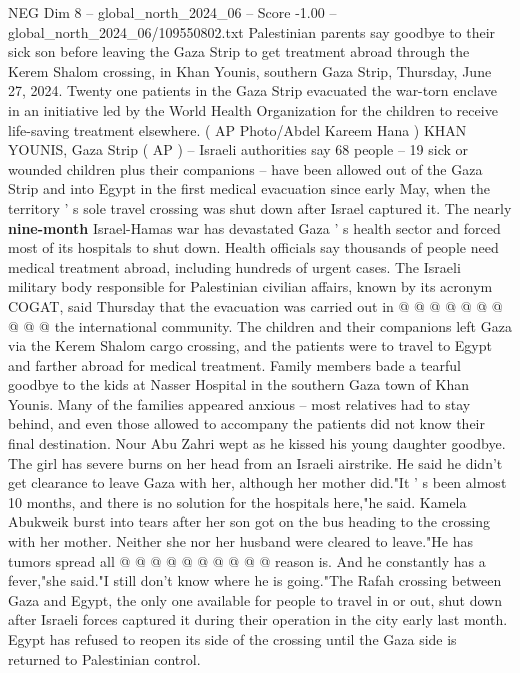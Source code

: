 \begin{textsample}{NEG Dim 8 – global\_north\_2024\_06 – Score -1.00 – global\_north\_2024\_06/109550802.txt}  \label{ex:f8_neg_196}
Palestinian parents say goodbye to their sick son before leaving the Gaza Strip to get treatment abroad through the Kerem Shalom crossing, in Khan Younis, southern Gaza Strip, Thursday, June 27, 2024.
Twenty one patients in the Gaza Strip evacuated the war-torn enclave in an initiative led by the World Health Organization for the children to receive life-saving treatment elsewhere. ( AP Photo/Abdel Kareem Hana ) KHAN YOUNIS, Gaza Strip ( AP ) -- Israeli authorities say 68 people -- 19 sick or wounded children plus their companions -- have been allowed out of the Gaza Strip and into Egypt in the first medical evacuation since early May, when the territory ' s sole travel crossing was shut down after Israel captured it.
The nearly \textbf{nine-month} Israel-Hamas war has devastated Gaza ' s health sector and forced most of its hospitals to shut down.
Health officials say thousands of people need medical treatment abroad, including hundreds of urgent cases.
The Israeli military body responsible for Palestinian civilian affairs, known by its acronym COGAT, said Thursday that the evacuation was carried out in @ @ @ @ @ @ @ @ @ @ the international community.
The children and their companions left Gaza via the Kerem Shalom cargo crossing, and the patients were to travel to Egypt and farther abroad for medical treatment.
Family members bade a tearful goodbye to the kids at Nasser Hospital in the southern Gaza town of Khan Younis.
Many of the families appeared anxious -- most relatives had to stay behind, and even those allowed to accompany the patients did not know their final destination.
Nour Abu Zahri wept as he kissed his young daughter goodbye.
The girl has severe burns on her head from an Israeli airstrike.
He said he didn't get clearance to leave Gaza with her, although her mother did."It ' s been almost 10 months, and there is no solution for the hospitals here,"he said.
Kamela Abukweik burst into tears after her son got on the bus heading to the crossing with her mother.
Neither she nor her husband were cleared to leave."He has tumors spread all @ @ @ @ @ @ @ @ @ @ reason is.
And he constantly has a fever,"she said."I still don't know where he is going."The Rafah crossing between Gaza and Egypt, the only one available for people to travel in or out, shut down after Israeli forces captured it during their operation in the city early last month.
Egypt has refused to reopen its side of the crossing until the Gaza side is returned to Palestinian control.

\end{textsample}
